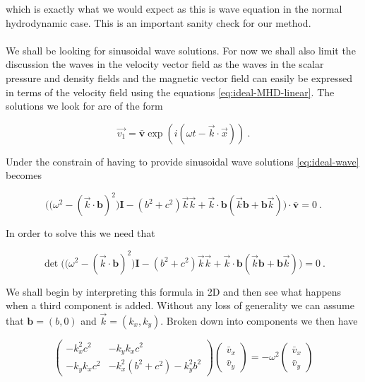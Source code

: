 which is exactly what we would expect as this is wave equation in the normal hydrodynamic case. This is an important sanity check for our method.\\
\\

We shall be looking for sinusoidal wave solutions. For now we shall also limit the discussion the waves in the velocity vector field as the waves in the scalar pressure and density fields and the magnetic vector field can easily be expressed in terms of the velocity field using the equations \autoref{eq:ideal-MHD-linear}. The solutions we look for are of the form

$$ \vec{v_1} = \bar{\textbf{v}} \exp(i(\omega t - \vec{k} \cdot \vec{x})) \ .$$ 

Under the constrain of having to provide sinusoidal wave solutions \autoref{eq:ideal-wave} becomes

\begin{equation}
\label{eq:plane-wave-equation}
\bigg( \big( \omega^2 - (\vec{k}\cdot \textbf{b})^2 \big)\textbf{I} - (b^2 + c^2)\vec{k}\vec{k} + \vec{k} \cdot \textbf{b}(\vec{k}\textbf{b} + \textbf{b}\vec{k}) \bigg) \cdot \bar{\textbf{v}} = 0 \ .
\end{equation} 

In order to solve this we need that 

$$ \det \bigg( \big( \omega^2 - (\vec{k}\cdot \textbf{b})^2 \big)\textbf{I} - (b^2 + c^2)\vec{k}\vec{k} + \vec{k} \cdot \textbf{b}(\vec{k}\textbf{b} + \textbf{b}\vec{k}) \bigg) = 0 \ .$$

We shall begin by interpreting this formula in 2D and then see what happens when a third component is added. Without any loss of generality we can assume that $\textbf{b} = (b, 0)$ and $\vec{k} = (k_x, k_y)$. Broken down into components we then have 

\begin{equation}
\begin{pmatrix}
 -k_x^2 c^2  &  - k_y k_x c^2 \\
- k_y k_x c^2  &    - k_x^2 (b^2 + c^2) - k_y^2 b^2
\end{pmatrix}
\begin{pmatrix}
\bar{v}_x \\
\bar{v}_y
\end{pmatrix}
 =  -\omega^2
\begin{pmatrix}
\bar{v}_x \\
\bar{v}_y
\end{pmatrix}
\end{equation} 

